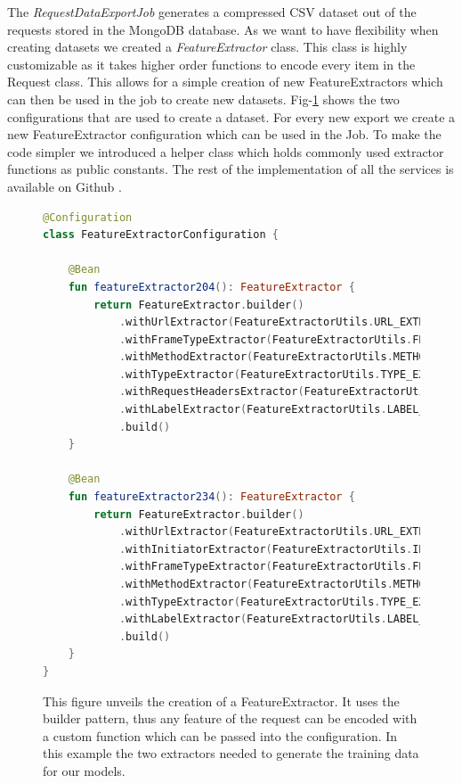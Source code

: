 The \emph{RequestDataExportJob} generates a compressed CSV dataset out of the requests stored in the MongoDB database. As we want 
to have flexibility when creating datasets we created a \emph{FeatureExtractor} class. This class is highly customizable as it
takes higher order functions
to encode every item in the Request class. This allows for a simple creation of new FeatureExtractors which can then be used in the job to create new datasets.
Fig-\ref{fig:Feature} shows the two configurations that are used to create a dataset. For every new export we
create a new FeatureExtractor configuration which can be used in the Job. To make the code simpler we introduced a helper class which 
holds commonly used extractor functions as public constants. The rest of the implementation of all the services is available on Github \cite{trackingDetectorInfra}.
\begin{figure}[ht!]
\begin{lstlisting}[language=Kotlin]
@Configuration
class FeatureExtractorConfiguration {

    @Bean
    fun featureExtractor204(): FeatureExtractor {
        return FeatureExtractor.builder()
            .withUrlExtractor(FeatureExtractorUtils.URL_EXTRACTOR)
            .withFrameTypeExtractor(FeatureExtractorUtils.FRAME_TYPE_EXTRACTOR)
            .withMethodExtractor(FeatureExtractorUtils.METHOD_EXTRACTOR)
            .withTypeExtractor(FeatureExtractorUtils.TYPE_EXTRACTOR)
            .withRequestHeadersExtractor(FeatureExtractorUtils.REQUEST_HEADER_REFERER)
            .withLabelExtractor(FeatureExtractorUtils.LABEL_EXTRACTOR)
            .build()
    }

    @Bean
    fun featureExtractor234(): FeatureExtractor {
        return FeatureExtractor.builder()
            .withUrlExtractor(FeatureExtractorUtils.URL_EXTRACTOR)
            .withInitiatorExtractor(FeatureExtractorUtils.INITIATOR_EXTRACTOR)
            .withFrameTypeExtractor(FeatureExtractorUtils.FRAME_TYPE_EXTRACTOR)
            .withMethodExtractor(FeatureExtractorUtils.METHOD_EXTRACTOR)
            .withTypeExtractor(FeatureExtractorUtils.TYPE_EXTRACTOR)
            .withLabelExtractor(FeatureExtractorUtils.LABEL_EXTRACTOR)
            .build()
    }
}
\end{lstlisting}
\caption{This figure unveils the creation of a FeatureExtractor. It uses the builder pattern, thus any feature of 
the request can be encoded with a custom function which can be passed into the configuration. In this example the two extractors needed
to generate the training data for our models.}
\label{fig:Feature}
\end{figure}

